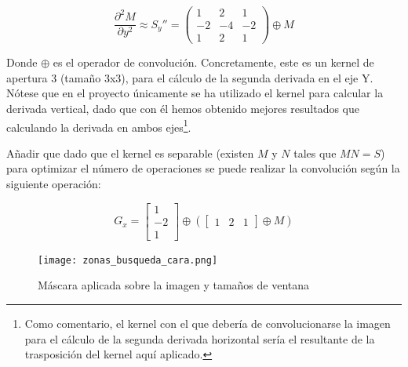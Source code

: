 \[ \frac{\partial^{2}{M}}{\partial{y^{2}}} \approx S_{y}''= \left( \begin{array}{ccc} 1 & 2 & 1 \\ -2 & -4 & -2 \\ 1 & 2 & 1  \end{array} \right) \oplus M \]

Donde $\oplus$ es el operador de convolución. Concretamente, este es un kernel de apertura 3 (tamaño 3x3), para el cálculo de la segunda derivada en el eje Y. Nótese que en el proyecto únicamente se ha utilizado el kernel para calcular la derivada vertical, dado que con él hemos obtenido mejores resultados que calculando la derivada en ambos ejes\footnote{Como comentario, el kernel con el que debería de convolucionarse la imagen para el cálculo de la segunda derivada horizontal sería el resultante de la trasposición del kernel aquí aplicado.}.

Añadir que dado que el kernel es separable (existen $M$ y $N$ tales que $MN=S$) para optimizar el número de operaciones se puede realizar la convolución según la siguiente operación:

\[G_{x}=\left[ \begin{array}{c} 1 \\ -2 \\1 \end{array} \right] \oplus \left( \left[ \begin{array}{ccc} 1 & 2 & 1 \end{array}\right] \oplus M \right) \]

\begin{figure}[h!]
	\centering
	\texttt{[image: zonas\_busqueda\_cara.png]}
	\caption{Máscara aplicada sobre la imagen y tamaños de ventana}
	\label{fig:imagen_mascaras}
\end{figure}

